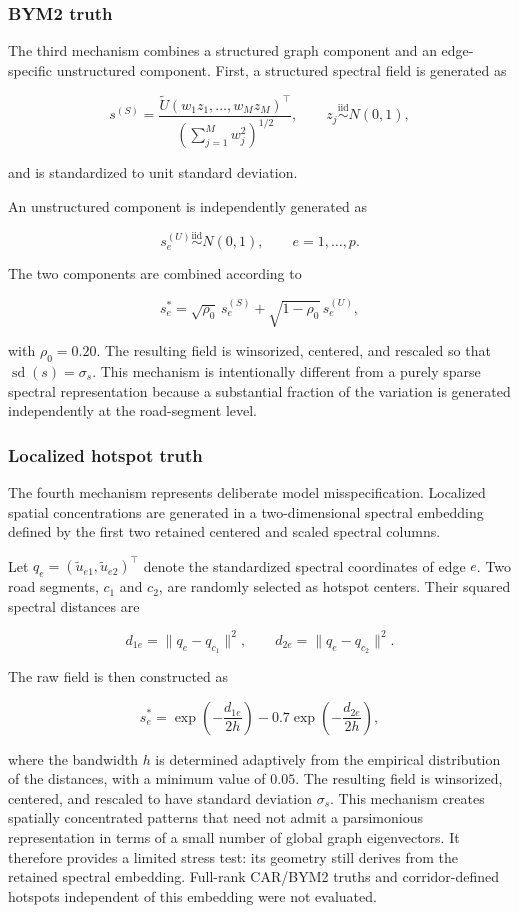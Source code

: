 \documentclass[11pt]{article}
\begin{document}
\subsubsection{BYM2 truth}

The third mechanism combines a structured graph component and an edge-specific unstructured component. First, a structured spectral field is generated as

\[
s^{(S)}
=
\frac{
	\widetilde U\left(w_1z_1,\ldots,w_Mz_M\right)^\top
}{
	\left(\sum_{j=1}^{M}w_j^2\right)^{1/2}
},
\qquad
z_j\stackrel{\mathrm{iid}}{\sim}N(0,1),
\]

and is standardized to unit standard deviation.

An unstructured component is independently generated as

\[
s_e^{(U)}\stackrel{\mathrm{iid}}{\sim}N(0,1),
\qquad e=1,\ldots,p.
\]

The two components are combined according to

\[
s_e^{\ast}
=
\sqrt{\rho_0}\,s_e^{(S)}
+
\sqrt{1-\rho_0}\,s_e^{(U)},
\]

with $\rho_0=0.20$. The resulting field is winsorized, centered, and rescaled so that $\operatorname{sd}(s)=\sigma_s$. This mechanism is intentionally different from a purely sparse spectral representation because a substantial fraction of the variation is generated independently at the road-segment level.

\subsubsection{Localized hotspot truth}

The fourth mechanism represents deliberate model misspecification. Localized spatial concentrations are generated in a two-dimensional spectral embedding defined by the first two retained centered and scaled spectral columns.

Let $q_e=(\widetilde u_{e1},\widetilde u_{e2})^\top$ denote the standardized spectral coordinates of edge $e$. Two road segments, $c_1$ and $c_2$, are randomly selected as hotspot centers. Their squared spectral distances are

\[
d_{1e}=\|q_e-q_{c_1}\|^2,
\qquad
d_{2e}=\|q_e-q_{c_2}\|^2.
\]

The raw field is then constructed as

\[
s_e^{\ast}
=
\exp\left(-\frac{d_{1e}}{2h}\right)
-
0.7
\exp\left(-\frac{d_{2e}}{2h}\right),
\]

where the bandwidth $h$ is determined adaptively from the empirical distribution of the distances, with a minimum value of $0.05$. The resulting field is winsorized, centered, and rescaled to have standard deviation $\sigma_s$. This mechanism creates spatially concentrated patterns that need not admit a parsimonious representation in terms of a small number of global graph eigenvectors. It therefore provides a limited stress test: its geometry still derives from the retained spectral embedding. Full-rank CAR/BYM2 truths and corridor-defined hotspots independent of this embedding were not evaluated.
\end{document}
